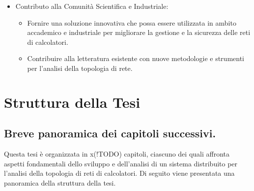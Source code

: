 \documentclass[target=bach,aauheader=,style=]{thud}
\begin{document}
\begin{itemize}


  \item Contributo alla Comunità Scientifica e Industriale:
    \begin{itemize}
      \item Fornire una soluzione innovativa che possa essere utilizzata in ambito accademico e industriale per migliorare la gestione e la sicurezza delle reti di calcolatori.
      \item Contribuire alla letteratura esistente con nuove metodologie e strumenti per l'analisi della topologia di rete.
    \end{itemize}

\end{itemize}



\section{Struttura della Tesi}
\subsection{Breve panoramica dei capitoli successivi.}
Questa tesi è organizzata in x(!TODO) capitoli, ciascuno dei quali affronta aspetti fondamentali dello sviluppo e dell'analisi di un sistema distribuito per l'analisi della topologia di reti di calcolatori. Di seguito viene presentata una panoramica della struttura della tesi.
\end{document}
